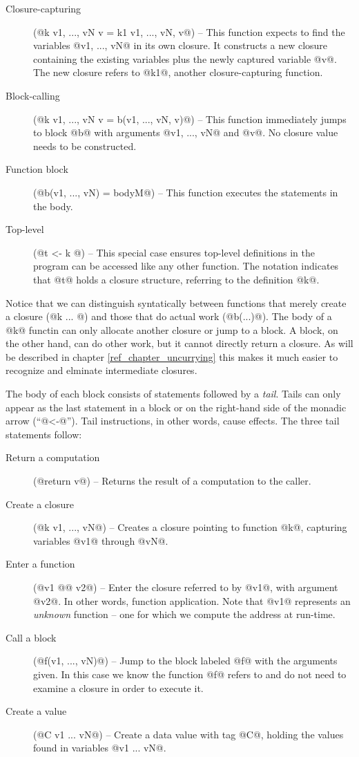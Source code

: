 \documentclass[12pt]{report}
\begin{document}
\begin{description}
  \item[Closure-capturing] (@k {v1, ..., vN} v = k1 {v1, ..., vN, v}@) -- This function
    expects to find the variables @v1, ..., vN@ in its own closure. It constructs
    a new closure containing the existing variables plus the newly captured variable
    @v@. The new closure refers to @k1@, another closure-capturing function.
  \item[Block-calling] (@k {v1, ..., vN} v = b(v1, ..., vN, v)@) -- This function immediately
    jumps to block @b@ with arguments @v1, ..., vN@ and @v@. No closure value needs to
    be constructed. 
  \item[Function block] (@b(v1, ..., vN) = bodyM@) -- This function executes the statements
    in the body. 
  \item[Top-level] (@t <- k {}@) -- This special case ensures top-level definitions in the program
    can be accessed like any other function. The notation indicates that @t@ holds a closure
    structure, referring to the definition @k@. 
\end{description}

Notice that we can distinguish syntatically between functions that
merely create a closure (@k { ... }@) and those that do actual work
(@b(...)@). The body of a @k@ functin can only allocate another
closure or jump to a block. A block, on the other hand, can do other
work, but it cannot directly return a closure. As will be described in
chapter \ref{ref_chapter_uncurrying} this makes it much easier to
recognize and elminate intermediate closures.

The body of each block consists of statements followed by a
\emph{tail}. Tails can only
appear as the last statement in a block or on the right-hand side of
the monadic arrow (``@<-@''). Tail instructions, in other words, cause 
effects. The three tail statements follow:

\begin{description}
\item[Return a computation] (@return v@) -- Returns the result of a computation
  to the caller.

\item[Create a closure] (@k {v1, ..., vN}@) -- Creates a closure pointing to
  function @k@, capturing variables @v1@ through @vN@.

\item[Enter a function] (@v1 @@ v2@) -- Enter the closure referred to by @v1@, with
  argument @v2@. In other words, function application. Note that @v1@ represents an
  \emph{unknown} function -- one for which we compute the address at run-time.

\item[Call a block] (@f(v1, ..., vN)@) -- Jump to the block labeled @f@ with the arguments
  given. In this case we know the function @f@ refers to and do not need to examine
  a closure in order to execute it.
\item[Create a value] (@C v1 ... vN@) -- Create a data value with tag @C@, holding
  the values found in variables @v1 ... vN@.
\end{description}
\end{document}
